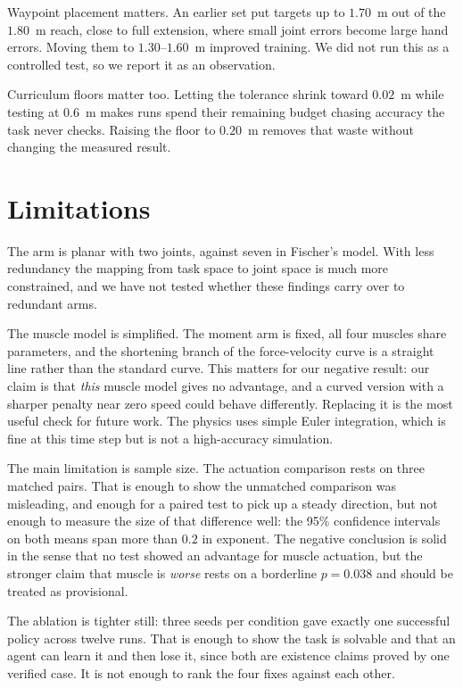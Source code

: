 \documentclass[conference]{IEEEtran}
\begin{document}
Waypoint placement matters. An earlier set put targets up to $1.70$~m out of
the $1.80$~m reach, close to full extension, where small joint errors become
large hand errors. Moving them to $1.30$--$1.60$~m improved training. We did
not run this as a controlled test, so we report it as an observation.

Curriculum floors matter too. Letting the tolerance shrink toward $0.02$~m
while testing at $0.6$~m makes runs spend their remaining budget chasing
accuracy the task never checks. Raising the floor to $0.20$~m removes that
waste without changing the measured result.

\section{Limitations}

The arm is planar with two joints, against seven in Fischer's model. With less
redundancy the mapping from task space to joint space is much more constrained,
and we have not tested whether these findings carry over to redundant arms.

The muscle model is simplified. The moment arm is fixed, all four muscles share
parameters, and the shortening branch of the force-velocity curve is a straight
line rather than the standard curve. This matters for our negative result: our
claim is that \emph{this} muscle model gives no advantage, and a curved version
with a sharper penalty near zero speed could behave differently. Replacing it
is the most useful check for future work. The physics uses simple Euler
integration, which is fine at this time step but is not a high-accuracy
simulation.

The main limitation is sample size. The actuation comparison rests on three
matched pairs. That is enough to show the unmatched comparison was misleading,
and enough for a paired test to pick up a steady direction, but not enough to
measure the size of that difference well: the 95\% confidence intervals on both
means span more than $0.2$ in exponent. The negative conclusion is solid in the
sense that no test showed an advantage for muscle actuation, but the stronger
claim that muscle is \emph{worse} rests on a borderline $p = 0.038$ and should
be treated as provisional.

The ablation is tighter still: three seeds per condition gave exactly one
successful policy across twelve runs. That is enough to show the task is
solvable and that an agent can learn it and then lose it, since both are
existence claims proved by one verified case. It is not enough to rank the four
fixes against each other.
\end{document}
